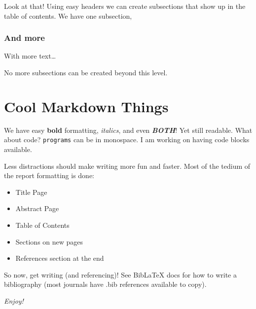 \documentclass{article}
\def\tightlist{}
\begin{document}
Look at that! Using easy headers we can create subsections that show up
in the table of contents. We have one subsection,

\subsubsection{And more}

With more text\ldots{}

No more subsections can be created beyond this level.

\section{Cool Markdown Things}

We have easy \textbf{bold} formatting, \emph{italics}, and even
\emph{\textbf{BOTH}}! Yet still readable. What about code?
\texttt{programs} can be in monospace. I am working on having code
blocks available.

Less distractions should make writing more fun and faster. Most of the
tedium of the report formatting is done:

\begin{itemize}
\tightlist
\item
  Title Page
\item
  Abstract Page
\item
  Table of Contents
\item
  Sections on new pages
\item
  References section at the end
\end{itemize}

So now, get writing (and referencing)! See BibLaTeX docs for how to
write a bibliography (most journals have .bib references available to
copy).

\emph{Enjoy!}

	
\end{document}
